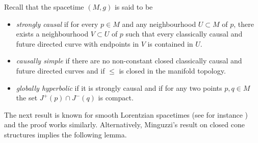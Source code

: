 \documentclass[a4paper,10pt]{article}
\numberwithin{equation}{section}
\begin{document}
Recall that the spacetime $(M, g)$ is said to be 
\begin{itemize}
    \item \textit{strongly causal} if for every $p \in M$ and any neighbourhood $U \subset M$ of $p$, there exists a neighbourhood $V \subset U$ of $p$ such that every classically causal and future directed curve with endpoints in $V$ is contained in $U$.
    \item \textit{causally simple} if there are no non-constant closed classically causal and future directed curves and if $\leq$ is closed in the manifold topology.
    \item \textit{globally hyperbolic} if it is strongly causal and if for any two points $p, q \in M$ the set $J^+(p) \cap J^-(q)$ is compact. 
\end{itemize}

The next result is known for smooth Lorentzian spacetimes (see for instance \cite{minguzzi2019lorentzian}) and the proof works similarly. Alternatively, Minguzzi's result on closed cone structures \cite[Theorem 2.47]{minguzzi2019causality} implies the following lemma.
\smallskip
\end{document}
